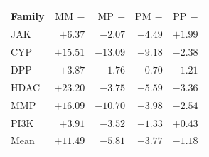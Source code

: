 \begin{tabular}{lrrrr}
\toprule
Family & $\mathrm{MM}$ $-$ \stl{} & $\mathrm{MP}$ $-$ \stl{} & $\mathrm{PM}$ $-$ \stl{} & $\mathrm{PP}$ $-$ \stl{} \\
\midrule
JAK & $+6.37$ & $-2.07$ & $+4.49$ & $+1.99$ \\
CYP & $+15.51$ & $-13.09$ & $+9.18$ & $-2.38$ \\
DPP & $+3.87$ & $-1.76$ & $+0.70$ & $-1.21$ \\
HDAC & $+23.20$ & $-3.75$ & $+5.59$ & $-3.36$ \\
MMP & $+16.09$ & $-10.70$ & $+3.98$ & $-2.54$ \\
PI3K & $+3.91$ & $-3.52$ & $-1.33$ & $+0.43$ \\
\midrule
Mean & $+11.49$ & $-5.81$ & $+3.77$ & $-1.18$ \\
\bottomrule
\end{tabular}

